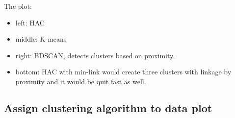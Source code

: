 		The plot:
		\begin{itemize}
		\item left: HAC 
		\item middle: K-means
		\item right: BDSCAN, detects clusters based on proximity.
		\item bottom: HAC with min-link would create three clusters with linkage by proximity and it would be quit fast as well. 
		\end{itemize}

		\noindent\makebox[\linewidth]{\rule{\textwidth}{1pt}} 

		\subsection*{Assign clustering algorithm to data plot}


